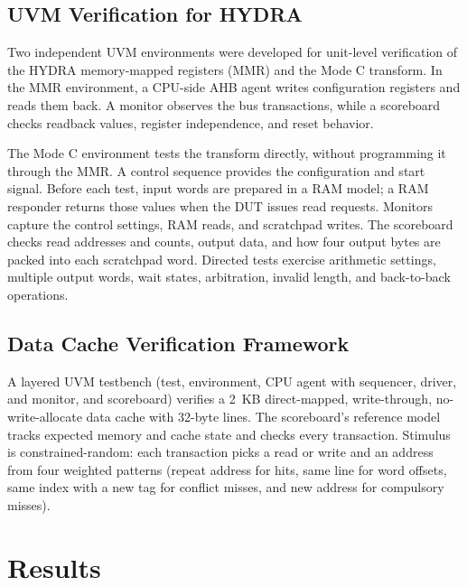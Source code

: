 \documentclass[conference]{IEEEtran}
\begin{document}
    \subsection{UVM Verification for HYDRA}
        Two independent UVM environments were developed for unit-level verification of the HYDRA memory-mapped registers (MMR) and the Mode C transform. In the MMR environment, a CPU-side AHB agent writes configuration registers and reads them back. A monitor observes the bus transactions, while a scoreboard checks readback values, register independence, and reset behavior.

        The Mode C environment tests the transform directly, without programming it through the MMR. A control sequence provides the configuration and start signal. Before each test, input words are prepared in a RAM model; a RAM responder returns those values when the DUT issues read requests. Monitors capture the control settings, RAM reads, and scratchpad writes. The scoreboard checks read addresses and counts, output data, and how four output bytes are packed into each scratchpad word. Directed tests exercise arithmetic settings, multiple output words, wait states, arbitration, invalid length, and back-to-back operations.
        
    \subsection{Data Cache Verification Framework}
        A layered UVM testbench (test, environment, CPU agent with
        sequencer, driver, and monitor, and scoreboard) verifies a 2~KB
        direct-mapped, write-through, no-write-allocate data cache with
        32-byte lines. The scoreboard's reference model tracks expected
        memory and cache state and checks every transaction. Stimulus is
        constrained-random: each transaction picks a read or write and an
        address from four weighted patterns (repeat address for hits, same
        line for word offsets, same index with a new tag for conflict
        misses, and new address for compulsory misses).
     
\section{Results}
\end{document}
